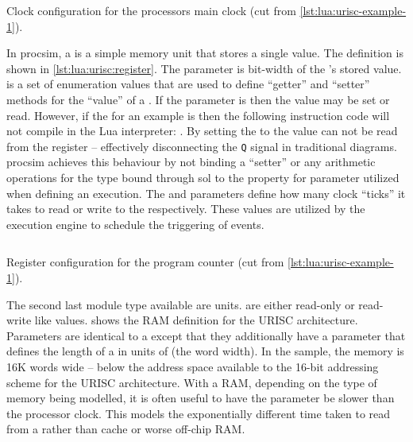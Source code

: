 \begin{listing}[h!]
    \inputminted[escapeinside=||, firstline=10, lastline=13]{lua}{./listings/urisc.lua}
    \caption{Clock configuration for the processors main clock (cut from \cref{lst:lua:urisc-example-1}).}
    \label{lst:lua:urisc:clock}
\end{listing}

In procsim, a  is a simple memory unit that stores a single value. The  definition is shown in \cref{lst:lua:urisc:register}. The  parameter is bit-width of the 's stored value.  is a set of enumeration values that are used to define ``getter'' and ``setter'' methods for the ``value'' of a . If the  parameter is  then the value may be set or read. However, if the  for an example   is  then the following instruction code will not compile in the Lua interpreter: . By setting the  to  the value can not be read from the register -- effectively disconnecting the \verb|Q| signal in traditional  diagrams. procsim achieves this behaviour by not binding a ``setter'' or any arithmetic operations for the  type bound through sol to the property for  parameter utilized when defining an  execution. The  and  parameters define how many clock ``ticks'' it takes to read or write to the  respectively. These values are utilized by the execution engine to schedule the triggering of events.

\begin{listing}[h!]
    \inputminted[escapeinside=||, firstline=17, lastline=23]{lua}{./listings/urisc.lua}
    \caption{Register configuration for the program counter (cut from \cref{lst:lua:urisc-example-1}).}
    \label{lst:lua:urisc:register}
\end{listing}

The second last module type available are  units.  are either read-only or read-write like  values.  shows the RAM definition for the URISC architecture. Parameters are identical to a  except that they additionally have a  parameter that defines the length of a  in units of  (the word width). In the sample, the memory is 16K words wide -- below the address space available to the 16-bit addressing scheme for the URISC architecture. With a RAM, depending on the type of memory being modelled, it is often useful to have the  parameter be slower than the processor clock. This models the exponentially different time taken to read from a  rather than cache or worse off-chip RAM.

